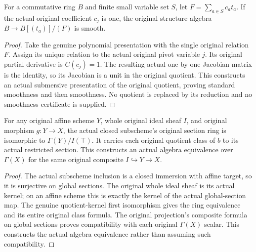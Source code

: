 \begin{lemma}
\label{lem:kn-nadel-bertini-linear-pivot-smooth}
\leanok
For a commutative ring $B$ and finite small variable set $S$, let
$F=\sum_{a\in S}c_at_a$. If the actual original coefficient $c_j$ is one,
the original structure algebra $B\to B[(t_a)]/(F)$ is smooth.
\end{lemma}
\begin{proof}
Take the genuine polynomial presentation with the single original relation
$F$. Assign its unique relation to the actual original pivot variable $j$.
Its original partial derivative is $C(c_j)=1$. The resulting actual one by
one Jacobian matrix is the identity, so its Jacobian is a unit in the
original quotient. This constructs an actual submersive presentation of
the original quotient, proving standard smoothness and then smoothness.
No quotient is replaced by its reduction and no smoothness certificate is
supplied.
\end{proof}

\begin{lemma}
\label{lem:kn-nadel-bertini-affine-subscheme-sections}
\leanok
For any original affine scheme $Y$, whole original ideal sheaf $I$, and
original morphism $g:Y\to X$, the actual closed subscheme's original
section ring is isomorphic to $\Gamma(Y)/I(\top)$. It carries each original
quotient class of $b$ to its actual restricted section. This constructs an
actual algebra equivalence over $\Gamma(X)$ for the same original composite
$I\hookrightarrow Y\to X$.
\end{lemma}
\begin{proof}
The actual subscheme inclusion is a closed immersion with affine target,
so it is surjective on global sections. The original whole ideal sheaf is
its actual kernel; on an affine scheme this is exactly the kernel of the
actual global-section map. The genuine quotient-kernel first isomorphism
gives the ring equivalence and its entire original class formula. The
original projection's composite formula on global sections proves
compatibility with each original $\Gamma(X)$ scalar. This constructs the
actual algebra equivalence rather than assuming such compatibility.
\end{proof}

